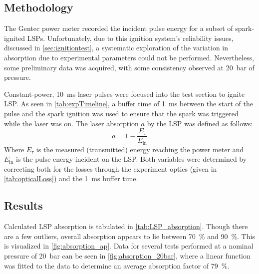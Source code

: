         \subsection{Methodology}
            The Gentec power meter recorded the incident pulse energy for a subset of spark-ignited LSPs. Unfortunately, due to this ignition system's reliability issues, discussed in \autoref{sec:ignitiontest}, a systematic exploration of the variation in absorption due to experimental parameters could not be performed. Nevertheless, some preliminary data was acquired, with some consistency observed at \qty{20}{bar} of pressure.

            Constant-power, \qty{10}{ms} laser pulses were focused into the test section to ignite LSP. As seen in \autoref{tab:expTimeline}, a buffer time of \qty{1}{ms} between the start of the pulse and the spark ignition was used to ensure that the spark was triggered while the laser was on. The laser absorption $a$ by the LSP was defined as follows:
            \begin{equation}
                a = 1-\frac{E_\tau}{E_\mathrm{in}}
            \end{equation}
            Where $E_\tau$ is the measured (transmitted) energy reaching the power meter and $E_\mathrm{in}$ is the pulse energy incident on the LSP. Both variables were determined by correcting both for the losses through the experiment optics (given in \autoref{tab:opticalLoss}) and the \qty{1}{ms} buffer time.

        \subsection{Results}
            Calculated LSP absorption is tabulated in \autoref{tab:LSP_absorption}. Though there are a few outliers, overall absorption appears to lie between 70~\% and 90~\%. This is visualized in \autoref{fig:absorption_ap}. Data for several tests performed at a nominal pressure of \qty{20}{bar} can be seen in \autoref{fig:absorption_20bar}, where a linear function was fitted to the data to determine an average absorption factor of 79~\%.

            
            
